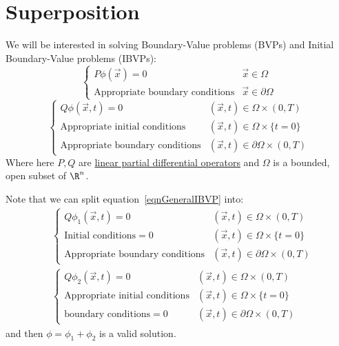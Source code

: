 \documentclass[../Main.tex]{subfiles}
\begin{document}
\section{Superposition}
We will be interested in solving Boundary-Value problems (BVPs) and Initial Boundary-Value problems (IBVPs):
\begin{equation}
    \begin{cases}
        P\phi(\vec{x}) = 0 & \vec{x} \in \Omega \\
        \text{Appropriate boundary conditions} & \vec{x} \in \partial \Omega
    \end{cases}
    \label{eqnGeneralBVP}
\end{equation}
\begin{equation}
    \begin{cases}
        Q\phi(\vec{x}, t) = 0 & (\vec{x}, t) \in \Omega \times (0, T) \\
        \text{Appropriate initial conditions} & (\vec{x}, t) \in \Omega \times \{t = 0\} \\
        \text{Appropriate boundary conditions} & (\vec{x}, t) \in \partial \Omega \times (0, T)
    \end{cases}
    \label{eqnGeneralIBVP}
\end{equation}
Where here $P, Q$ are \underline{linear partial differential operators} and $\Omega$ is a bounded, open subset of $\R^n$.

Note that we can split equation~\ref{eqnGeneralIBVP} into:
\begin{align*}
    &\begin{cases}
        Q\phi_1(\vec{x}, t) = 0 & (\vec{x}, t) \in \Omega \times (0, T) \\
        \text{Initial conditions} = 0 & (\vec{x}, t) \in \Omega \times \{t = 0\} \\
        \text{Appropriate boundary conditions} & (\vec{x}, t) \in \partial \Omega \times (0, T)
    \end{cases} \\
    &\begin{cases}
        Q\phi_2(\vec{x}, t) = 0 & (\vec{x}, t) \in \Omega \times (0, T) \\
        \text{Appropriate initial conditions} & (\vec{x}, t) \in \Omega \times \{t = 0\} \\
        \text{boundary conditions} = 0 & (\vec{x}, t) \in \partial \Omega \times (0, T)
    \end{cases}
\end{align*}
and then $\phi = \phi_1 + \phi_2$ is a valid solution.
\end{document}
